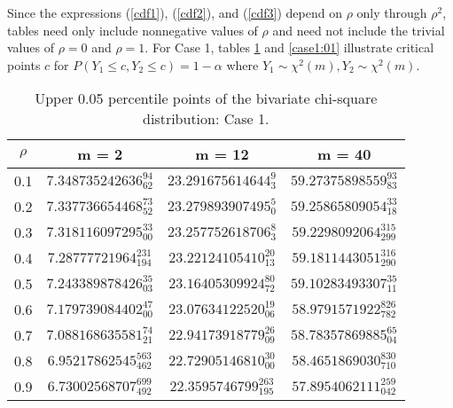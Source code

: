 \documentclass[10pt,letterpaper]{article}
\begin{document}
Since the expressions (\ref{cdf1}), (\ref{cdf2}), and (\ref{cdf3})
depend on $\rho$ only through
$\rho^2$, tables need only include nonnegative values of $\rho$ and need not
include the trivial values of $\rho=0$ and $\rho=1$.
For Case 1, 
tables \ref{case1:05} and \ref{case1:01} illustrate critical points
$c$ for $P(Y_1 \leq c, Y_2 \leq c) = 1- \alpha$ where $Y_1 \sim \chi^2(m), 
Y_2 \sim \chi^2(m)$.  
\renewcommand{\arraystretch}{1.3}
\begin{table}[ht!]
\caption{Upper 0.05 percentile points of the bivariate chi-square distribution:
Case 1.}
\label{case1:05}
\begin{center} 
\begin{tabular}{cccc} \hline\hline
$\rho$ & m = 2 & m = 12 & m = 40 \\ \hline
0.1  & $ 7.348735242636_{62}^{94} $ & $ 23.291675614644_3^9 $       & $ 59.27375898559_{83}^{93} $ \\
0.2  & $ 7.337736654468_{52}^{73} $ & $ 23.279893907495_0^5  $      & $ 59.25865809054_{18}^{33}$ \\
0.3  & $ 7.318116097295_{00}^{33} $ & $ 23.257752618706_3^8 $       & $ 59.2298092064_{299}^{315}$ \\
0.4  & $ 7.28777721964_{194}^{231} $ & $ 23.22124105410_{13}^{20}  $ & $ 59.1811443051_{290}^{316} $ \\
0.5  & $ 7.243389878426_{03}^{35} $ & $ 23.16405309924_{72}^{80}  $ & $ 59.10283493307_{11}^{35} $ \\
0.6  & $ 7.179739084402_{00}^{47} $ & $ 23.07634122520_{06}^{19}  $ & $ 58.9791571922_{782}^{826} $ \\
0.7  & $ 7.088168635581_{21}^{74} $ & $ 22.94173918779_{09}^{26}  $ & $ 58.78357869885_{04}^{65} $ \\
0.8  & $ 6.95217862545_{462}^{563} $ & $ 22.72905146810_{00}^{30}  $ & $ 58.4651869030_{710}^{830} $ \\
0.9  & $ 6.73002568707_{492}^{699} $ & $ 22.3595746799_{195}^{263}        $ &
$ 57.8954062111_{042}^{259} $ \\ \hline
\end{tabular}
\end{center}
\end{table}
\renewcommand{\arraystretch}{1}
\renewcommand{\arraystretch}{1.3}
\end{document}
